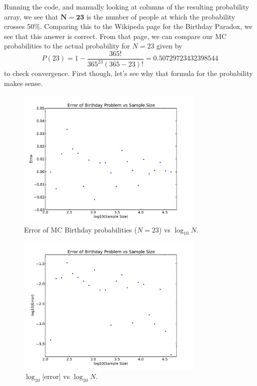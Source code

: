 \documentclass[11pt,letterpaper]{article}
\begin{document}
Running the code, and manually looking at columns of the resulting probability 
array, we see that $\mathbf{N=23}$ is the number of people at which 
the probability crosses 50\%. Comparing this to the Wikipeda page for the Birthday
Paradox, we see that this answer is correct. From that page, we can compare 
our MC probabilities to the actual probability for $N = 23$ given by 
$$ P(23) = 1 - \frac{365!}{365^{23}(365-23)!} = 0.50729723432398544$$
to check convergence. First though, let's see why that formula for the probability
makes sense. 

\begin{figure}[bth]
\centering
\includegraphics[width=0.8\textwidth]{birth_err_plot.pdf}
\caption{Error of MC Birthday probabilities ($N=23$) vs $\log_{10} N$.}
\label{fig:birthplot1}
\end{figure}

\begin{figure}
\centering
\includegraphics[width=0.8\textwidth]{birth_logerr_plot.pdf}
\caption{$\log_{10}$|error| vs $\log_{10} N$.}
\label{fig:birthplot2}
\end{figure} 
\end{document}
